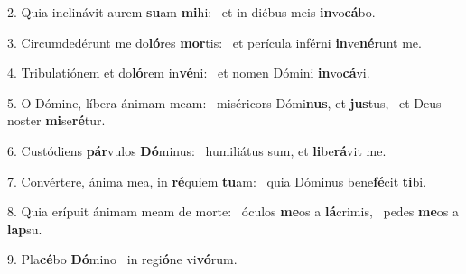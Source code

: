 2. Quia inclinávit aurem \textbf{su}am \textbf{mi}hi: \ast\  et in diébus meis \textbf{in}vo\textbf{cá}bo.\

3. Circumdedérunt me do\textbf{ló}res \textbf{mor}tis: \ast\  et perícula inférni \textbf{in}ve\textbf{né}runt me.\

4. Tribulatiónem et do\textbf{ló}rem in\textbf{vé}ni: \ast\  et nomen Dómini \textbf{in}vo\textbf{cá}vi.\

5. O Dómine, líbera ánimam meam: \dag\  miséricors Dómi\textbf{nus}, et \textbf{jus}tus, \ast\  et Deus noster \textbf{mi}se\textbf{ré}tur.\

6. Custódiens \textbf{pár}vulos \textbf{Dó}minus: \ast\  humiliátus sum, et \textbf{li}be\textbf{rá}vit me.\

7. Convértere, ánima mea, in \textbf{ré}quiem \textbf{tu}am: \ast\  quia Dóminus bene\textbf{fé}cit \textbf{ti}bi.\

8. Quia erípuit ánimam meam de morte: \dag\  óculos \textbf{me}os a \textbf{lá}crimis, \ast\  pedes \textbf{me}os a \textbf{lap}su.\

9. Pla\textbf{cé}bo \textbf{Dó}mino \ast\  in regi\textbf{ó}ne vi\textbf{vó}rum.\

